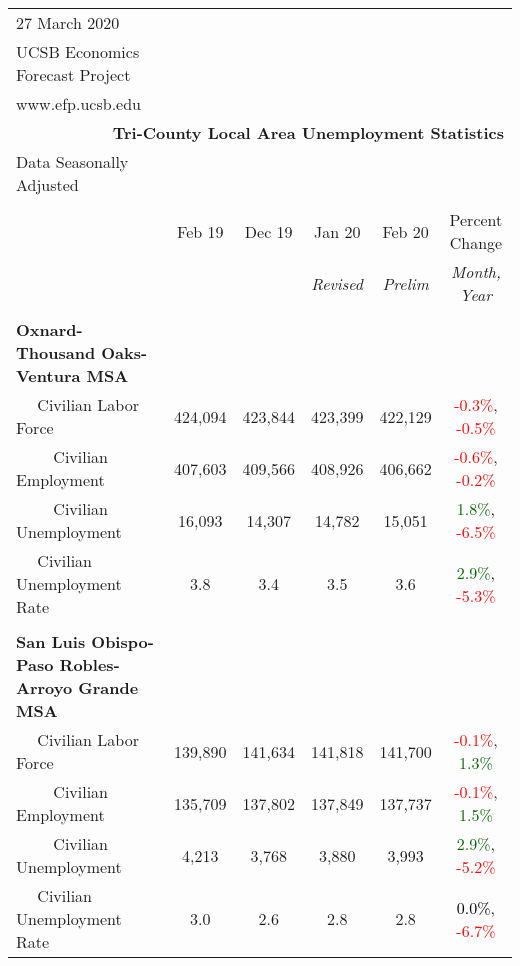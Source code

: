 \documentclass[12pt]{article}
\begin{document}
\begin{landscape}
\begin{table}
\begin{tabular}{|l|c|c|c|c|c|}
\multicolumn{1}{l}{\small 27 March 2020} & \multicolumn{5}{c}{} \\
\multicolumn{1}{l}{\small UCSB Economics Forecast Project} & \multicolumn{5}{c}{} \\
\multicolumn{1}{l}{\small www.efp.ucsb.edu} & \multicolumn{5}{c}{} \\
\multicolumn{6}{r}{\large \textbf{Tri-County Local Area Unemployment Statistics}} \\
\multicolumn{1}{l}{\small Data Seasonally Adjusted} & \multicolumn{5}{c}{} \\ \hline \hline
& & & & & \\
 & Feb 19 & Dec 19 & Jan 20 & Feb 20 & Percent Change \\
 & & & \small \textit{Revised} & \small \textit{Prelim} & \small \textit{Month, Year} \\ \hline
&&&&& \\
\textbf{Oxnard-Thousand Oaks-Ventura MSA} &&&&& \\
$\quad$ Civilian Labor Force &424,094 & 423,844 & 423,399 & 422,129 & \textcolor{red}{-0.3\%}, \textcolor{red}{-0.5\%} \\
$\qquad$ \small Civilian Employment &407,603 & 409,566 & 408,926 & 406,662 & \textcolor{red}{-0.6\%}, \textcolor{red}{-0.2\%} \\
$\qquad$ \small Civilian Unemployment &16,093 & 14,307 & 14,782 & 15,051 & \textcolor{darkgreen}{1.8\%}, \textcolor{red}{-6.5\%} \\
$\quad$ Civilian Unemployment Rate &3.8 & 3.4 & 3.5 & 3.6 & \textcolor{darkgreen}{2.9\%}, \textcolor{red}{-5.3\%} \\
&&&&& \\
\textbf{San Luis Obispo-Paso Robles-Arroyo Grande MSA} &&&&& \\
$\quad$ Civilian Labor Force &139,890 & 141,634 & 141,818 & 141,700 & \textcolor{red}{-0.1\%}, \textcolor{darkgreen}{1.3\%} \\
$\qquad$ \small Civilian Employment &135,709 & 137,802 & 137,849 & 137,737 & \textcolor{red}{-0.1\%}, \textcolor{darkgreen}{1.5\%} \\
$\qquad$ \small Civilian Unemployment &4,213 & 3,768 & 3,880 & 3,993 & \textcolor{darkgreen}{2.9\%}, \textcolor{red}{-5.2\%} \\
$\quad$ Civilian Unemployment Rate &3.0 & 2.6 & 2.8 & 2.8 & \textcolor{black}{0.0\%}, \textcolor{red}{-6.7\%} \\

\end{tabular}
\end{table}
\end{landscape}
\end{document}

